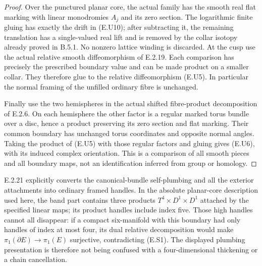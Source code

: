 \begin{proof}
Over the punctured planar core, the actual family has the
smooth real flat marking with linear monodromies $A_j$ and
its zero section.  The logarithmic finite gluing has exactly
the drift in (E.U10); after subtracting it, the remaining
translation has a single-valued real lift and is removed by
the collar isotopy already proved in B.5.1.  No nonzero
lattice winding is discarded.  At the cusp use the actual
relative smooth diffeomorphism of E.2.19.  Each comparison
has precisely the prescribed boundary value and can be
made product on a smaller collar.  They therefore glue to
the relative diffeomorphism (E.U5).  In particular the
normal framing of the unfilled ordinary fibre is unchanged.

Finally use the two hemispheres in the actual shifted
fibre-product decomposition of E.2.6.  On each hemisphere
the other factor is a regular marked torus bundle over a
disc, hence a product preserving its zero section and flat
marking.  Their common boundary has unchanged torus
coordinates and opposite normal angles.  Taking the product
of (E.U5) with those regular factors and gluing gives
(E.U6), with its induced complex orientation.  This is a
comparison of all smooth pieces and all boundary maps,
not an identification inferred from group or homology.
\end{proof}

E.2.21 explicitly converts the canonical-bundle self-plumbing and
all the exterior attachments into ordinary framed handles.
In the absolute planar-core description used here, the band part
contains three products
$T^4\times D^1\times D^1$ attached by the specified linear maps;
its product handles include index five.  Those high handles
cannot all disappear: if a compact six-manifold with this boundary
had only handles of index at most four, its dual relative
decomposition would make $\pi_1(\partial E)\to\pi_1(E)$ surjective,
contradicting (E.S1).  The displayed plumbing presentation is
therefore not being confused with a four-dimensional thickening
or a chain cancellation.
